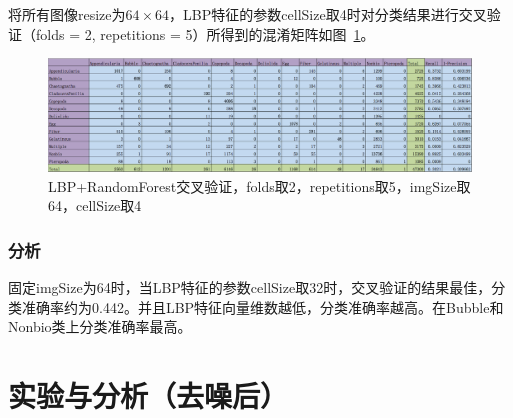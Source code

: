 \documentclass[12pt]{article}
\begin{document}
将所有图像resize为$64 \times 64$，LBP特征的参数cellSize取4时对分类结果进行交叉验证（folds = 2, repetitions = 5）所得到的混淆矩阵如图~\ref{fig: LBP-RF-2-folds-5-repetitions-4-64}。
\begin{figure}[!ht]
\centering
\includegraphics[width=1.0\linewidth]{LBP-RF-2-folds-5-repetitions-4-64}
\caption{LBP+RandomForest交叉验证，folds取2，repetitions取5，imgSize取64，cellSize取4}
\label{fig: LBP-RF-2-folds-5-repetitions-4-64}
\end{figure}

\subsubsection{分析}

固定imgSize为64时，当LBP特征的参数cellSize取32时，交叉验证的结果最佳，分类准确率约为0.442。并且LBP特征向量维数越低，分类准确率越高。在Bubble和Nonbio类上分类准确率最高。


\section{实验与分析（去噪后）}
\end{document}
